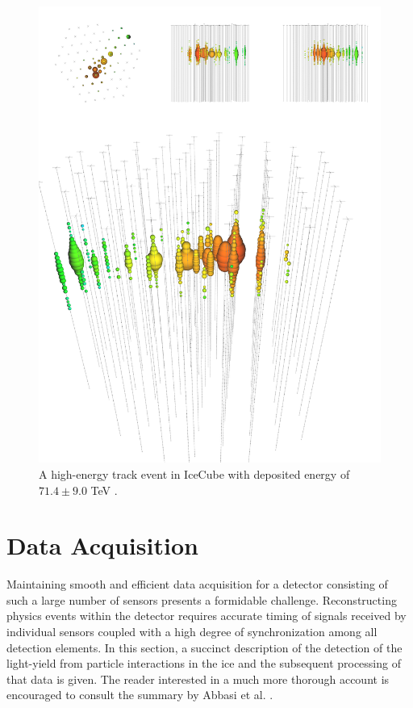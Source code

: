 \documentclass{gatech-thesis}
\begin{document}
\begin{figure}[ht]
  \begin{center}
    \includegraphics[width=1.0\textwidth,keepaspectratio]{hese_track_event.png}
  \end{center}
  \caption[Sample Track Event]{A high-energy track event in IceCube with deposited energy of $71.4 \pm 9.0$ TeV \cite{2013Sci...342E...1I}.}
  \label{fig:track}
\end{figure}


\chapter{Data Acquisition}
Maintaining smooth and efficient data acquisition for a detector consisting of such a large number of sensors presents a formidable challenge. Reconstructing physics events within the detector requires accurate timing of signals received by individual sensors coupled with a high degree of synchronization among all detection elements. In this section, a succinct description of the detection of the light-yield from particle interactions in the ice and the subsequent processing of that data is given. The reader interested in a much more thorough account is encouraged to consult the summary by Abbasi et al. \cite{2009NIMPA.601..294A}. 
\end{document}
